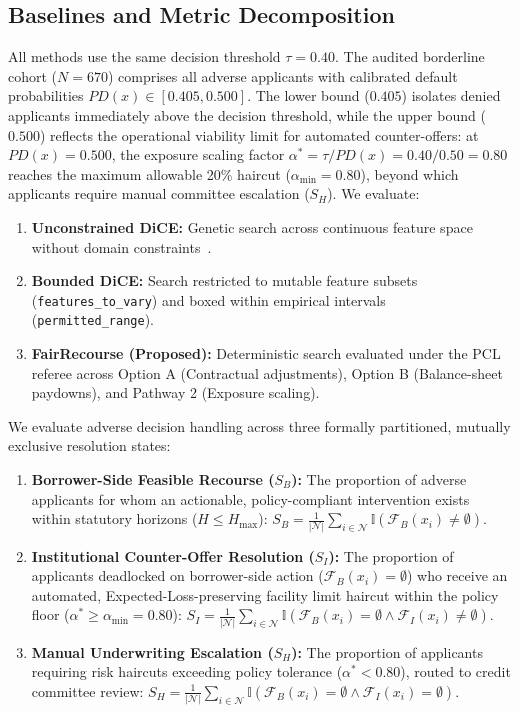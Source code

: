 \documentclass[manuscript,screen,review,anonymous]{acmart}
\begin{document}
\subsection{Baselines and Metric Decomposition}
All methods use the same decision threshold $\tau = 0.40$. The audited borderline cohort ($N=670$) comprises all adverse applicants with calibrated default probabilities $PD(x) \in [0.405, 0.500]$. The lower bound ($0.405$) isolates denied applicants immediately above the decision threshold, while the upper bound ($0.500$) reflects the operational viability limit for automated counter-offers: at $PD(x) = 0.500$, the exposure scaling factor $\alpha^* = \tau / PD(x) = 0.40 / 0.50 = 0.80$ reaches the maximum allowable 20\% haircut ($\alpha_{\min} = 0.80$), beyond which applicants require manual committee escalation ($S_H$). We evaluate:
\begin{enumerate}
    \item \textbf{Unconstrained DiCE:} Genetic search across continuous feature space without domain constraints~\cite{mothilal2020dice}.
    \item \textbf{Bounded DiCE:} Search restricted to mutable feature subsets (\texttt{features\_to\_vary}) and boxed within empirical intervals (\texttt{permitted\_range}).
    \item \textbf{FairRecourse (Proposed):} Deterministic search evaluated under the PCL referee across Option A (Contractual adjustments), Option B (Balance-sheet paydowns), and Pathway 2 (Exposure scaling).
\end{enumerate}

\noindent We evaluate adverse decision handling across three formally partitioned, mutually exclusive resolution states:
\begin{enumerate}
    \item \textbf{Borrower-Side Feasible Recourse ($S_B$):} The proportion of adverse applicants for whom an actionable, policy-compliant intervention exists within statutory horizons ($H \le H_{\max}$): $S_B = \frac{1}{|\mathcal{N}|} \sum_{i \in \mathcal{N}} \mathbb{I}(\mathcal{F}_B(x_i) \neq \emptyset)$.
    \item \textbf{Institutional Counter-Offer Resolution ($S_I$):} The proportion of applicants deadlocked on borrower-side action ($\mathcal{F}_B(x_i) = \emptyset$) who receive an automated, Expected-Loss-preserving facility limit haircut within the policy floor ($\alpha^* \ge \alpha_{\min} = 0.80$): $S_I = \frac{1}{|\mathcal{N}|} \sum_{i \in \mathcal{N}} \mathbb{I}(\mathcal{F}_B(x_i) = \emptyset \land \mathcal{F}_I(x_i) \neq \emptyset)$.
    \item \textbf{Manual Underwriting Escalation ($S_H$):} The proportion of applicants requiring risk haircuts exceeding policy tolerance ($\alpha^* < 0.80$), routed to credit committee review: $S_H = \frac{1}{|\mathcal{N}|} \sum_{i \in \mathcal{N}} \mathbb{I}(\mathcal{F}_B(x_i) = \emptyset \land \mathcal{F}_I(x_i) = \emptyset)$.
\end{enumerate}
\end{document}
